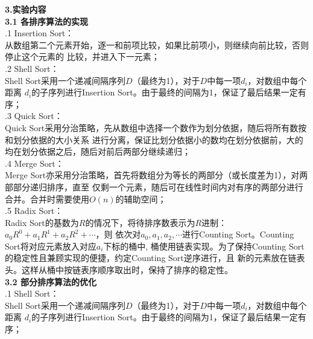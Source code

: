 \documentclass[a4paper]{article}
\begin{document}
\begin{enumerate}
  \textbf{3.实验内容}\\
  \textbf{3.1 各排序算法的实现}\\
  .1 Insertion Sort：\\
  从数组第二个元素开始，逐一和前项比较，如果比前项小，则继续向前比较，否则停止这个元素的
  比较，并进入下一元素；\\
  .2 Shell Sort：\\
  Shell Sort采用一个递减间隔序列$D$（最终为1），对于$D$中每一项$d_i$，对数组中每个距离
  $d_i$的子序列进行Insertion Sort。由于最终的间隔为1，保证了最后结果一定有序；\\
  .3 Quick Sort：\\
  Quick Sort采用分治策略，先从数组中选择一个数作为划分依据，随后将所有数按和划分依据的大小关系
  进行分离，保证比划分依据小的数均在划分依据前，大的均在划分依据之后，随后对前后两部分继续递归；\\
  .4 Merge Sort：\\
  Merge Sort亦采用分治策略，首先将数组分为等长的两部分（或长度差为1），对两部部分递归排序，直至
  仅剩一个元素，随后可在线性时间内对有序的两部分进行合并。合并时需要使用$O(n)$的辅助空间；\\
  .5 Radix Sort：\\
  Radix Sort的基数为$R$的情况下，将待排序数表示为$R$进制：$a_0R^0+a_1R^1+a_2R^2+\cdots$，则
  依次对$a_0,a_1,a_2,\cdots$进行Counting Sort。Counting Sort将对应元素放入对应$a_i$下标的桶中,
  桶使用链表实现。为了保持Counting Sort的稳定性且兼顾实现的便捷，约定Counting Sort逆序进行，且
  新的元素放在链表头。这样从桶中按链表序顺序取出时，保持了排序的稳定性。\\
  \medskip
  \textbf{3.2 部分排序算法的优化}\\
  .1 Shell Sort：\\
  Shell Sort采用一个递减间隔序列$D$（最终为1），对于$D$中每一项$d_i$，对数组中每个距离
  $d_i$的子序列进行Insertion Sort。由于最终的间隔为1，保证了最后结果一定有序；\\
  \medskip


\end{enumerate}
\end{document}
